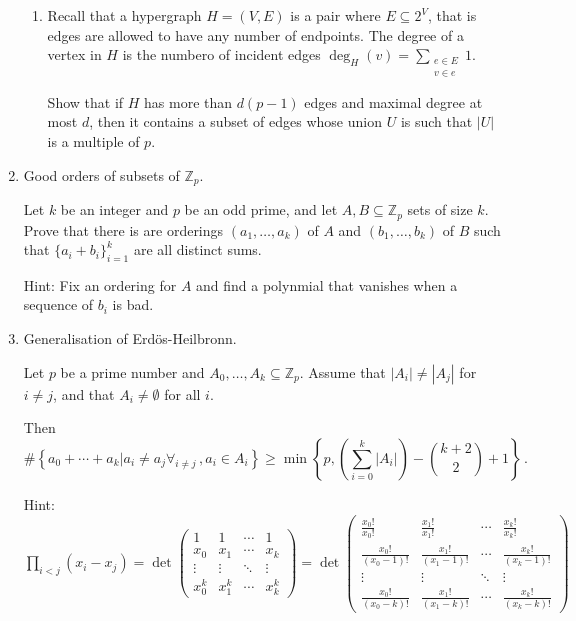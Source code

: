 \documentclass[kulak]{tplt}
\theoremstyle{definition}
\newcommand{\Z}{\mathbb{Z}}
\begin{document}
\begin{enumerate}
\begin{enumerate}
\item 
Recall that a hypergraph $H = (V, E)$ is a pair where $E \subseteq 2^V$, that is edges are allowed to have any number of endpoints.
The degree of a vertex in $H$ is the numbero of incident edges $\deg_H (v) = \sum_{\substack{e\in E \\ v \in e}} 1$.

Show that if $H$ has more than $d(p-1)$ edges and maximal degree at most $d$, then it contains a subset of edges whose union $U$ is such that $|U|$ is a multiple of $p$.

\end{enumerate}

\item Good orders of subsets of $\Z_p$.

Let $k$ be an integer and $p$ be an odd prime, and let $A, B \subseteq \Z_p$ sets of size $k$.
Prove that there is are orderings $(a_1, \ldots, a_k)$ of $A$ and $(b_1, \ldots, b_k)$ of $B$ such that $\{a_i+b_i\}_{i=1}^k$ are all distinct sums.

Hint: Fix an ordering for $A$ and find a polynmial that vanishes when a sequence of $b_i$ is bad.

\item Generalisation of Erd\"os-Heilbronn.

Let $p$ be a prime number and $A_0, \ldots, A_k \subseteq \Z_p$.
Assume that $|A_i|\neq |A_j| $ for $i\neq j$, and that $A_i \neq \emptyset $ for all $i$.

Then 
$$ \#\left\{ a_0 + \cdots + a_k \Big| a_i \neq a_j \forall_{i\neq j} \, , a_i \in A_i \right\} \geq \min \left\{p, \left( \sum_{i=0}^k |A_i| \right) - \binom{k+2}{2}  + 1 \right\}\, . $$

Hint: $\prod_{i < j} (x_i - x_j) = \det \begin{pmatrix}
1 & 1 & \cdots & 1\\
x_0 & x_1 & \cdots & x_k \\
\vdots & \vdots & \ddots & \vdots \\
x_0^k & x_1^k & \cdots & x_k^k 
\end{pmatrix}= \det \begin{pmatrix}
\frac{x_0!}{x_0!} & \frac{x_1!}{x_1!} & \cdots & \frac{x_k!}{x_k!}\\
\frac{x_0!}{(x_0-1)!} & \frac{x_1!}{(x_1-1)!} & \cdots & \frac{x_k!}{(x_k-1)!} \\
\vdots & \vdots & \ddots & \vdots \\
\frac{x_0!}{(x_0-k)!} & \frac{x_1!}{(x_1-k)!} & \cdots & \frac{x_k!}{(x_k-k)!}
\end{pmatrix}$

\end{enumerate}
\end{document}
